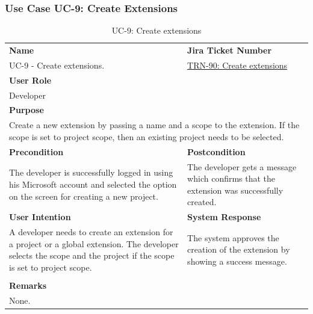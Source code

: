 \subsubsection{Use Case UC-9: Create Extensions}\label{subsubsec:use-case-uc-9:-create-extensions}

\begin{table}[H]
    \centering
    \begin{tabular}{|p{}|p{}|}

        \hline
        \rowcolor{gray!50}\textbf{Name} & \rowcolor{gray!50}\textbf{Jira Ticket Number} \\
        UC-9 - Create extensions.
        &
        \href{https://fh-burgenland.atlassian.net/browse/TRN-90}{TRN-90: Create extensions} \\ \hline

        \multicolumn{2}{|l|}{\rowcolor{gray!50}\textbf{User Role}} \\
        \multicolumn{2}{|l|}{Developer} \\ \hline

        \multicolumn{2}{|l|}{\rowcolor{gray!50}\textbf{Purpose}} \\
        \multicolumn{2}{|p{1\textwidth}|}{Create a new extension by passing a name and a scope to the extension. If the scope is set to project scope, then an existing project needs to be selected.} \\ \hline

        \rowcolor{gray!50}\textbf{Precondition} & \rowcolor{gray!50}\textbf{Postcondition} \\
        The developer is successfully logged in using his Microsoft account and selected the option on the screen for creating a new project.
        &
        The developer gets a message which confirms that the extension was successfully created.\\ \hline

        \rowcolor{gray!50}\textbf{User Intention} & \rowcolor{gray!50}\textbf{System Response} \\
        A developer needs to create an extension for a project or a global extension.
        The developer selects the scope and the project if the scope is set to project scope.
        &
        The system approves the creation of the extension by showing a success message. \\ \hline

        & \\ \hline

        \multicolumn{2}{|l|}{\rowcolor{gray!50}\textbf{Remarks}} \\
        \multicolumn{2}{|p{1\textwidth}|}{None.} \\ \hline
    \end{tabular}
    \caption{UC-9: Create extensions}
    \label{tab:uc-create-extensions}
\end{table}

